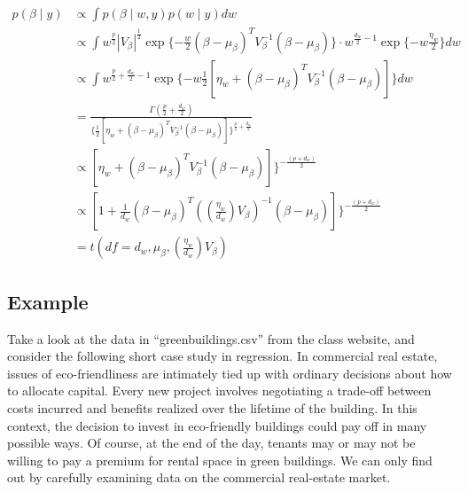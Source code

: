 \documentclass[11pt]{article}
\newcommand{\half}{\frac{1}{2}}
\begin{document}
\begin{enumerate}[(A)]
\begin{align*}
    p(\beta \mid y) &\propto \int p(\beta \mid w,y) p(w \mid y) dw \\
    &\propto \int w^{\frac{p}{2}} |V_\beta|^{\half} \exp\{-\frac{w}{2} (\beta-\mu_\beta)^T V_\beta^{-1} (\beta-\mu_\beta) \} \cdot w^{\frac{d_w}{2}-1} \exp\{-w\frac{\eta_w}{2}\} dw \\
    & \propto \int w^{\frac{p}{2}+\frac{d_w}{2} - 1} \exp\{-w \half[\eta_w + (\beta-\mu_\beta)^T V_\beta^{-1} (\beta-\mu_\beta)]\} dw \\
    &= \frac{\Gamma(\frac{p}{2} + \frac{d_w}{2})}{\{\half[\eta_w + (\beta-\mu_\beta)^T V_\beta^{-1} (\beta-\mu_\beta)] \}^{\frac{p}{2} + \frac{d_w}{2}}} \\
    &\propto [\eta_w + (\beta-\mu_\beta)^T V_\beta^{-1} (\beta-\mu_\beta)] \}^{-\frac{(p+d_w)}{2}} \\
    &\propto [1 + \frac{1}{d_w}(\beta-\mu_\beta)^T ((\frac{\eta_w}{d_w})V_\beta)^{-1} (\beta-\mu_\beta)] \}^{-\frac{(p+d_w)}{2}} \\
    &= t(df=d_w, \mu_\beta, (\frac{\eta_w}{d_w})V_\beta )
\end{align*}

\end{enumerate}

\subsection{Example}

 Take a look at the data in ``greenbuildings.csv'' from the class website, and consider the following short case study in regression.  In commercial real estate, issues of eco-friendliness are intimately tied up with ordinary decisions about how to allocate capital.   Every new project involves negotiating a trade-off between costs incurred and benefits realized over the lifetime of the building. In this context, the decision to invest in eco-friendly buildings could pay off in many possible ways.  Of course, at the end of the day, tenants may or may not be willing to pay a premium for rental space in green buildings.  We can only find out by carefully examining data on the commercial real-estate market.
\end{document}
